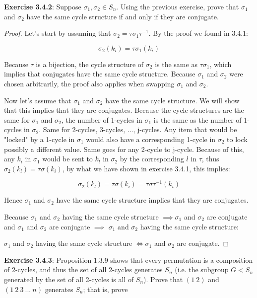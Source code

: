 \documentclass[a4paper]{article}
\begin{document}
\begin{myparindent}{0pt}
\textbf{Exercise 3.4.2}:
Suppose $\sigma_1, \sigma_2 \in S_n$. Using the previous exercise, prove that
$\sigma_1$ and $\sigma_2$ have the same cycle structure if and only if they
are conjugate.
\begin{proof}
  Let's start by assuming that $\sigma_2 = \tau \sigma_1 \tau^{-1}$. By the proof
  we found in 3.4.1:

  \[ \sigma_2(k_i) = \tau \sigma_1(k_i) \]

  Because $\tau$ is a bijection, the cycle structure of $\sigma_2$ is the same
  as $\tau \sigma_1$, which implies that conjugates have the same cycle structure.
  Because $\sigma_1$ and $\sigma_2$ were chosen arbitrarily, the proof also applies
  when swapping $\sigma_1$ and $\sigma_2$.
  \newline

  Now let's assume that $\sigma_1$ and $\sigma_2$ have the same cycle structure.
  We will show that this implies that they are conjugates. Because the cycle
  structures are the same for $\sigma_1$ and $\sigma_2$, the number of 1-cycles
  in $\sigma_1$ is the same as the number of 1-cycles in $\sigma_2$. Same for
  2-cycles, 3-cycles, ..., j-cycles. Any item that would be "locked" by a 1-cycle
  in $\sigma_1$ would also have a corresponding 1-cycle in $\sigma_2$ to lock
  possibly a different value. Same goes for any 2-cycle to j-cycle. Because of
  this, any $k_i$ in $\sigma_1$ would be sent to $k_l$ in $\sigma_2$ by the
  corresponding $l$ in $\tau$, thus $\sigma_2(k_l) = \tau \sigma(k_i)$, by
  what we have shown in exercise 3.4.1, this implies:

  \[ \sigma_2(k_l) = \tau \sigma(k_i) = \tau \sigma \tau^{-1} (k_i) \]

  Hence $\sigma_1$ and $\sigma_2$ have the same cycle structure implies that
  they are conjugates. \newline

  Because $\sigma_1$ and $\sigma_2$ having the same cycle structure
  $\implies \sigma_1$ and $\sigma_2$ are conjugate and $\sigma_1$ and
  $\sigma_2$ are conjugate $\implies$ $\sigma_1$ and $\sigma_2$ having the same
  cycle structure: \newline


  $\sigma_1$ and $\sigma_2$ having the same cycle structure
  $\iff \sigma_1$ and $\sigma_2$ are conjugate.
\end{proof}

\textbf{Exercise 3.4.3}:
Proposition 1.3.9 shows that every permutation is a composition of 2-cycles, and
thus the set of all 2-cycles generates $S_n$ (i.e. the subgroup $G < S_n$
generated by the set of all 2-cycles is all of $S_n$). Prove that $(1 ~2)$ and
$(1 ~2 ~3 ~... ~n)$ generates $S_n$; that is, prove


\end{myparindent}
\end{document}
